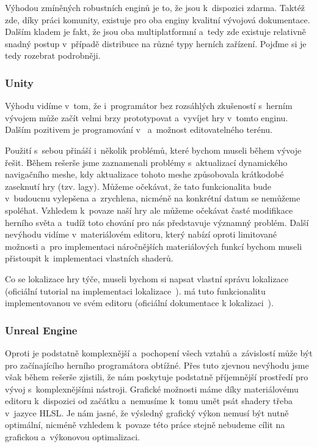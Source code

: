 Výhodou zmíněných robustních enginů je to, že jsou k~dispozici zdarma. Taktéž zde, díky práci komunity, existuje pro oba enginy kvalitní vývojová dokumentace. Dalším kladem je fakt, že jsou oba multiplatformní a~tedy zde existuje relativně snadný postup v~případě distribuce na různé typy herních zařízení. Pojďme si je tedy rozebrat podrobněji.

\subsubsection{Unity}
Výhodu \UN{} vidíme v~tom, že i~programátor bez rozsáhlých zkušeností s~herním vývojem může začít velmi brzy prototypovat a~vyvíjet hry v~tomto enginu. Dalším pozitivem je programování v~\CS{} a~možnost editovatelného terénu.

Použití \UN{} s~sebou přináší i~několik problémů, které bychom museli během vývoje řešit. Během rešerše jsme zaznamenali problémy s~aktualizací dynamického navigačního meshe, kdy aktualizace tohoto meshe způsobovala krátkodobé zaseknutí hry (tzv. lagy). Můžeme očekávat, že tato funkcionalita bude v~budoucnu vylepšena a~zrychlena, nicméně na konkrétní datum se nemůžeme spoléhat. Vzhledem k~povaze naší hry ale můžeme očekávat časté modifikace herního světa a~tudíž toto chování pro nás představuje významný problém. Další nevýhodu vidíme v~materiálovém editoru, který nabízí oproti \UE{} limitované možnosti a~pro implementaci náročnějších materiálových funkcí bychom museli přistoupit k~implementaci vlastních shaderů.

Co se lokalizace hry týče, museli bychom si napsat vlastní správu lokalizace (oficiální tutorial na implementaci lokalizace~\citep{unity_loc}). \UE{} má tuto funkcionalitu implementovanou ve svém editoru (oficiální dokumentace k lokalizaci~\citep{ue_loc}).


\subsubsection{Unreal Engine}
Oproti \UN{} je \UE{} podstatně komplexnější a~pochopení všech vztahů a~závislostí může být pro začínajícího herního programátora obtížné. Přes tuto zjevnou nevýhodu jsme však během rešerše zjistili, že \UE{} nám poskytuje podstatně příjemnější prostředí pro vývoj s~komplexnějšími nástroji. Grafické možnosti máme díky materiálovému editoru k~dispozici od začátku a~nemusíme k~tomu umět psát shadery třeba v~jazyce HLSL. Je nám jasné, že výsledný grafický výkon nemusí být nutně optimální, nicméně vzhledem k~povaze této práce stejně nebudeme cílit na grafickou a~výkonovou optimalizaci.

